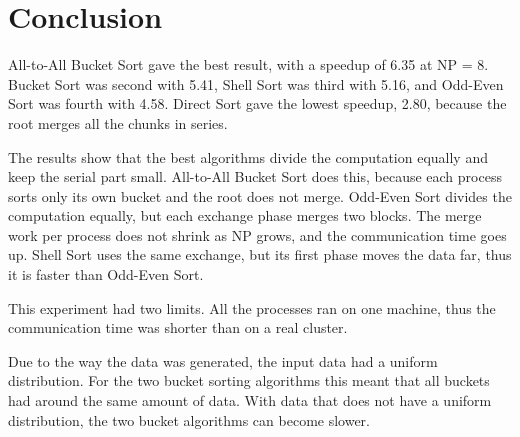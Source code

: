 \section{Conclusion}

All-to-All Bucket Sort gave the best result, with a speedup of 6.35 at NP = 8.
Bucket Sort was second with 5.41, Shell Sort was third with 5.16, and Odd-Even Sort was fourth with 4.58.
Direct Sort gave the lowest speedup, 2.80, because the root merges all the chunks in series.

The results show that the best algorithms divide the computation equally and keep the serial part small.
All-to-All Bucket Sort does this, because each process sorts only its own bucket and the root does not merge.
Odd-Even Sort divides the computation equally, but each exchange phase merges two blocks.
The merge work per process does not shrink as NP grows, and the communication time goes up.
Shell Sort uses the same exchange, but its first phase moves the data far, thus it is faster than Odd-Even Sort.


This experiment had two limits.
All the processes ran on one machine, thus the communication time was shorter than on a real cluster.

Due to the way the data was generated, the input data had a uniform distribution. For the two bucket sorting algorithms this meant that
all buckets had around the same amount of data. 
With data that does not have a uniform distribution, the two bucket algorithms can become slower.
